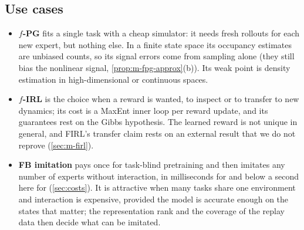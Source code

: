 \subsection{Use cases}

\begin{itemize}[nosep]
\item \textbf{$f$-PG} fits a single task with a cheap simulator: it needs fresh rollouts for each new expert, but nothing else. In a finite state space its occupancy estimates are unbiased counts, so its signal errors come from sampling alone (they still bias the nonlinear signal, \cref{prop:m-fpg-approx}(b)). Its weak point is density estimation in high-dimensional or continuous spaces.
\item \textbf{$f$-IRL} is the choice when a reward is wanted, to inspect or to transfer to new dynamics; its cost is a MaxEnt inner loop per reward update, and its guarantees rest on the Gibbs hypothesis. The learned reward is not unique in general, and FIRL's transfer claim rests on an external result that we do not reprove (\cref{sec:m-firl}).
\item \textbf{FB imitation} pays once for task-blind pretraining and then imitates any number of experts without interaction, in milliseconds for \ERFB{} and below a second here for \DMFB{} (\cref{sec:costs}). It is attractive when many tasks share one environment and interaction is expensive, provided the model is accurate enough on the states that matter; the representation rank and the coverage of the replay data then decide what can be imitated.
\end{itemize}
